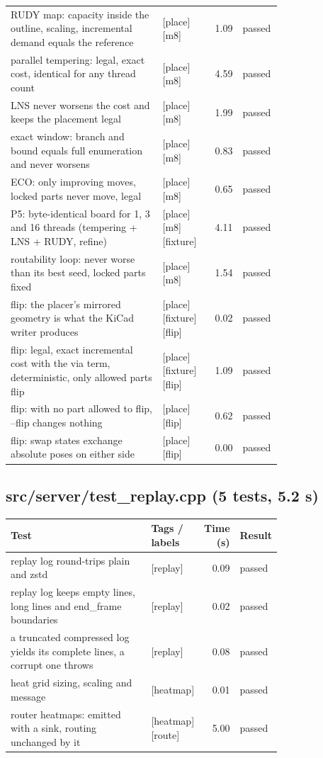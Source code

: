 \begin{longtable}{@{}p{0.57\linewidth}p{0.19\linewidth}rl@{}}
RUDY map: capacity inside the outline, scaling, incremental demand equals the reference & {\footnotesize [place][m8]} & 1.09 & passed \\
parallel tempering: legal, exact cost, identical for any thread count & {\footnotesize [place][m8]} & 4.59 & passed \\
LNS never worsens the cost and keeps the placement legal & {\footnotesize [place][m8]} & 1.99 & passed \\
exact window: branch and bound equals full enumeration and never worsens & {\footnotesize [place][m8]} & 0.83 & passed \\
ECO: only improving moves, locked parts never move, legal & {\footnotesize [place][m8]} & 0.65 & passed \\
P5: byte-identical board for 1, 3 and 16 threads (tempering + LNS + RUDY, refine) & {\footnotesize [place][m8][fixture]} & 4.11 & passed \\
routability loop: never worse than its best seed, locked parts fixed & {\footnotesize [place][m8]} & 1.54 & passed \\
flip: the placer's mirrored geometry is what the KiCad writer produces & {\footnotesize [place][fixture][flip]} & 0.02 & passed \\
flip: legal, exact incremental cost with the via term, deterministic, only allowed parts flip & {\footnotesize [place][fixture][flip]} & 1.09 & passed \\
flip: with no part allowed to flip, --flip changes nothing & {\footnotesize [place][flip]} & 0.62 & passed \\
flip: swap states exchange absolute poses on either side & {\footnotesize [place][flip]} & 0.00 & passed \\
\bottomrule\end{longtable}
\subsection*{src/\allowbreak{}server/\allowbreak{}test\_\allowbreak{}replay.cpp (5 tests, 5.2 s)}
\begin{longtable}{@{}p{0.57\linewidth}p{0.19\linewidth}rl@{}}
\toprule Test & Tags / labels & Time (s) & Result \\ \midrule \endhead
replay log round-trips plain and zstd & {\footnotesize [replay]} & 0.09 & passed \\
replay log keeps empty lines, long lines and end\_frame boundaries & {\footnotesize [replay]} & 0.02 & passed \\
a truncated compressed log yields its complete lines, a corrupt one throws & {\footnotesize [replay]} & 0.08 & passed \\
heat grid sizing, scaling and message & {\footnotesize [heatmap]} & 0.01 & passed \\
router heatmaps: emitted with a sink, routing unchanged by it & {\footnotesize [heatmap][route]} & 5.00 & passed \\
\bottomrule\end{longtable}
